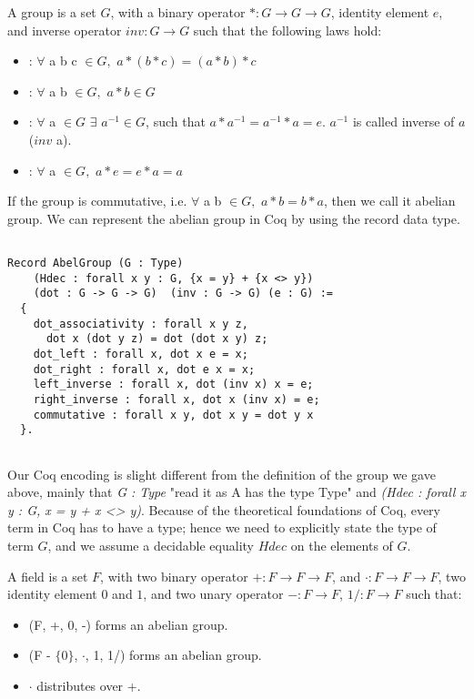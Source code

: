 \begin{definition}[Group] 
A group is a set $G$, with a binary operator $* : G \rightarrow G \rightarrow G$, identity element $e$, and inverse operator $inv : G \rightarrow G$ such 
    that the following laws hold:  \end{definition} 
    \begin{itemize}
     \item {}: $\forall$  a b c $\in G,$  $a * (b * c) = (a * b) * c$
    \item {}: $\forall$ a b $\in G,$  $a * b \in G$
    \item {}: $\forall$ a $\in G$ $\exists$ $a^{-1} \in G$, such that $a * a^{-1} = a^{-1} * a = e$. $a^{-1}$ is called inverse of $a$ ($inv$ a).
    \item {}: $\forall$ a $\in G,$  $a * e = e * a  = a$
    \end{itemize}
  
    \noindent
    If the group is commutative, i.e. $\forall$ a b $\in  G,$  $a * b = b * a$, then we call it abelian group.  We can represent the abelian group in Coq by using the 
    record data type. 
 
 \begin{verbatim}

Record AbelGroup (G : Type) 
    (Hdec : forall x y : G, {x = y} + {x <> y}) 
    (dot : G -> G -> G)  (inv : G -> G) (e : G) :=
  {
    dot_associativity : forall x y z, 
      dot x (dot y z) = dot (dot x y) z;
    dot_left : forall x, dot x e = x;
    dot_right : forall x, dot e x = x;
    left_inverse : forall x, dot (inv x) x = e;
    right_inverse : forall x, dot x (inv x) = e;
    commutative : forall x y, dot x y = dot y x
  }.
  
\end{verbatim}    

\noindent
Our Coq encoding is slight different from the definition of the group we gave above, mainly that \textit{G : Type} "read it as A has the type Type" and 
\textit{(Hdec : forall x y : G, {x = y} + {x <> y})}. Because of the theoretical foundations of Coq, every term in Coq has to have a type;
hence we need to explicitly state the type of term $G$, and we assume a decidable equality $Hdec$ on the elements of $G$.  

\begin{definition}[Field] 
A field  is a set $F$, with two binary operator $+ : F \rightarrow F \rightarrow F$,  and $\cdot : F \rightarrow F \rightarrow F$, 
two identity element $0$ and $1$, and two unary operator $- : F \rightarrow F$, $1/ : F \rightarrow F$  such that:
\end{definition} 
 \begin{itemize}
 \item (F, +, 0, -) forms an abelian group.
 \item (F - $\lbrace 0 \rbrace$, $\cdot$, 1, 1/) forms an abelian group.
 \item $\cdot$ distributes over +.
 \end{itemize}
 
